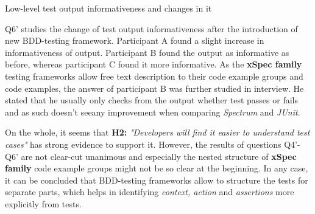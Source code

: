     \begin{table}[H]
            \caption {Low-level test output informativeness and changes in it} \label{tab:changes-pt5}
    \end{table}

Q6' studies the change of test output informativeness after the introduction of new BDD-testing framework. Participant A
found a slight increase in informativeness of output. Participant B found the output as informative as before, whereas participant
C found it more informative. As the \textbf{xSpec family} testing frameworks allow free text description to their
code example groups and code examples, the answer of participant B was further studied in interview. He stated that
he usually only checks from the output whether test passes or fails and as such doesn't see\noindent any improvement when
comparing \textit{Spectrum} and \textit{JUnit}.

On the whole, it seems that \textbf{H2:} \textit{"Developers will find it easier to understand test cases"} has strong
evidence to support it. However, the results of questions Q4'-Q6' are not clear-cut unanimous and especially the nested structure of \textbf{xSpec family}
code example groups might not be so clear at the beginning. In any case, it can be concluded that BDD-testing
frameworks allow to structure the tests for separate parts, which helps in identifying \textit{context, action}
and \textit{assertions} more explicitly from tests.

